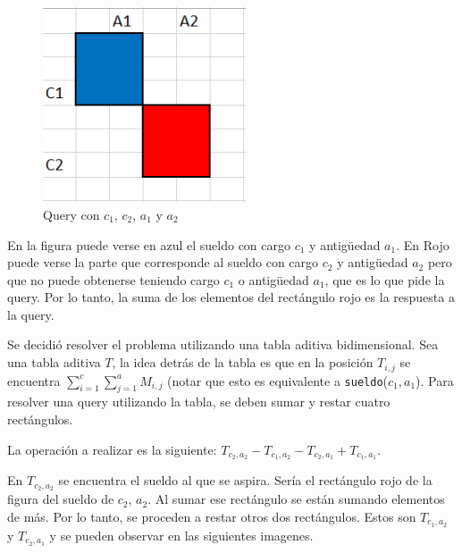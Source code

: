 \begin{figure}[H]
\centering
\includegraphics[width=6cm]{Imagenes/Ej3a.png}
\caption{Query con $c_1$, $c_2$, $a_1$ y $a_2$}
\end{figure}

En la figura puede verse en azul el sueldo con cargo $c_1$ y antigüedad $a_1$. En Rojo puede verse la parte que corresponde al sueldo con cargo $c_2$ y antigüedad $a_2$ pero que no puede obtenerse teniendo cargo $c_1$ o antigüedad $a_1$, que es lo que pide la query. Por lo tanto, la suma de los elementos del rectángulo rojo es la respuesta a la query.

Se decidió resolver el problema utilizando una tabla aditiva bidimensional. Sea una tabla aditiva $T$, la idea detrás de la tabla es que en la posición $T_{i,j}$ se encuentra $\sum_{i=1}^{c} \sum_{j=1}^{a} M_{i,j}$ (notar que esto es equivalente a \texttt{sueldo}($c_1,a_1$). Para resolver una query utilizando la tabla, se deben sumar y restar cuatro rectángulos.

La operación a realizar es la siguiente: $T_{c_2,a_2} - T_{c_1,a_2} - T_{c_2,a_1} + T_{c_1,a_1}$. 

En $T_{c_2,a_2}$ se encuentra el sueldo al que se aspira. Sería el rectángulo rojo de la figura del sueldo de $c_2$, $a_2$. Al sumar ese rectángulo se están sumando elementos de más. Por lo tanto, se proceden a restar otros dos rectángulos. Estos son  $T_{c_1,a_2}$ y $T_{c_2,a_1}$ y se pueden observar en las siguientes imagenes.

